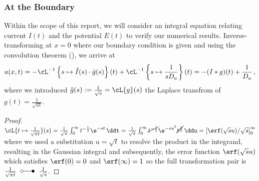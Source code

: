 \documentclass{prettytex/ox/mmsc-special-topic}
\begin{document}
  \subsubsection{At the Boundary}
  Within the scope of this report, we will consider an integral equation relating current $I(t)$ and the potential $E(t)$ to verify our numerical results.
  Inverse-transforming  at $x = 0$ where our boundary condition is given and using the convolution theorem (), we arrive at
  \begin{align*}
    a(x, t) = -\cL^{-1}\left\{s \mapsto \hat{I}(s) \cdot \hat{g}(s)\right\}(t) + \cL^{-1}\left\{s \mapsto \frac{1}{s D_a}\right\}(t) = -(I * g)(t) + \frac{1}{D_a}\,,
  \end{align*}
  where we introduced $\hat{g}(s) := \frac{1}{\sqrt{s}} = \cL\{g\}(s)$ the Laplace transfrom of $g(t) = \frac{1}{\sqrt{\pi t}}$.
  \begin{proof}
    $\cL\{t \mapsto \frac{1}{\sqrt{\pi t}}\}(s) = \frac{1}{\sqrt{\pi}} \int_0^\infty t^{-\frac{1}{2}} \e^{-st} \,\ddt = \frac{1}{\sqrt{\pi}} \int_0^\infty \cancel{t^{-\frac{1}{2}}} \e^{-su^2} \cancel{t^{\frac{1}{2}}}\,\ddu = \left[\erf(\sqrt{s} u) / \sqrt{s}\right]_0^\infty$ where we used a substitution $u = \sqrt{t}$ to resolve the product in the integrand, resulting in the Gaussian integral and subsequently, the error function $\erf(\sqrt{s}u)$ which satisfies $\erf(0) = 0$ and $\erf(\infty) = 1$ so the full transformation pair is $\frac{1}{\sqrt{\pi t}} \;\laplace\; \frac{1}{\sqrt{s}}$.
  \end{proof}
\end{document}
